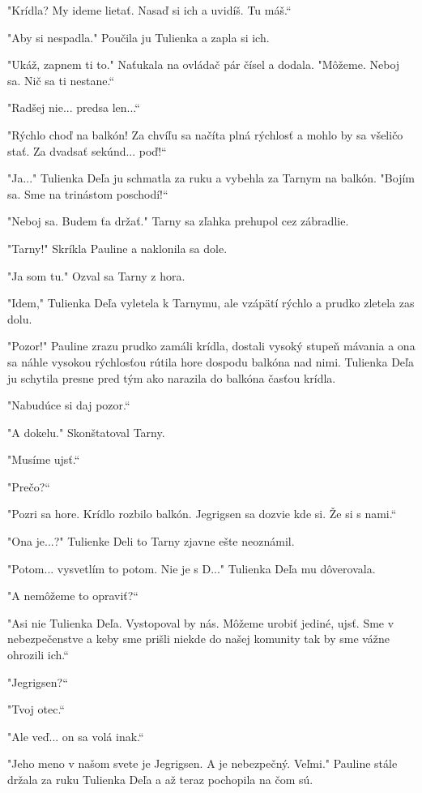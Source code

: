\documentclass{book}
\begin{document}
"Krídla? My ideme lietať. Nasaď si ich a uvidíš. Tu máš.“

"$ $Aby si nespadla."$ $ Poučila ju Tulienka a zapla si ich.

"$ $Ukáž, zapnem ti to."$ $ Naťukala na ovládač pár čísel a dodala. "Môžeme. Neboj sa. Nič sa ti nestane.“

"Radšej nie... predsa len...“

"Rýchlo choď na balkón! Za chvíľu sa načíta plná rýchlosť a mohlo by sa všeličo stať. Za dvadsať sekúnd... poď!“

"Ja..."$ $ Tulienka Deľa ju schmatla za ruku a vybehla za Tarnym na balkón. "Bojím sa. Sme na trinástom poschodí!“

"Neboj sa. Budem ťa držať."$ $ Tarny sa zľahka prehupol cez zábradlie.

"Tarny!"$ $ Skríkla Pauline a naklonila sa dole.

"Ja som tu."$ $ Ozval sa Tarny z hora.

"$ $Idem,"$ $ Tulienka Deľa vyletela k Tarnymu, ale vzápätí rýchlo a prudko zletela zas dolu.

"Pozor!"$ $ Pauline zrazu prudko zamáli krídla, dostali vysoký stupeň mávania a ona sa náhle vysokou rýchlosťou rútila hore dospodu balkóna nad nimi. Tulienka Deľa ju schytila presne pred tým ako narazila do balkóna časťou krídla.

"Nabudúce si daj pozor.“

"$ $A dokelu."$ $ Skonštatoval Tarny.

"Musíme ujsť.“

"Prečo?“

"Pozri sa hore. Krídlo rozbilo balkón. Jegrigsen sa dozvie kde si. Že si s nami.“

"$ $Ona je...?"$ $ Tulienke Deli to Tarny zjavne ešte neoznámil.

"Potom... vysvetlím to potom. Nie je s D..."$ $ Tulienka Deľa mu dôverovala.

"$ $A nemôžeme to opraviť?“

"$ $Asi nie Tulienka Deľa. Vystopoval by nás. Môžeme urobiť jediné, ujsť. Sme v nebezpečenstve a keby sme prišli niekde do našej komunity tak by sme vážne ohrozili ich.“

"Jegrigsen?“

"Tvoj otec.“

"$ $Ale veď... on sa volá inak.“

"Jeho meno v našom svete je Jegrigsen. A je nebezpečný. Veľmi."$ $ Pauline stále držala za ruku Tulienka Deľa a až teraz pochopila na čom sú.
\end{document}
